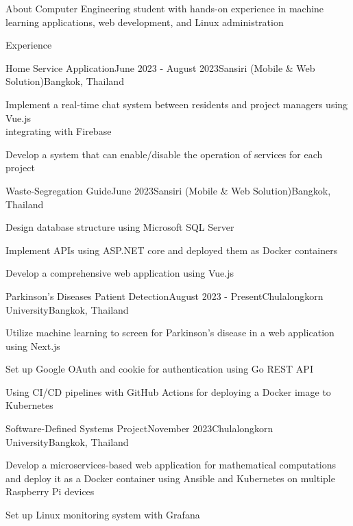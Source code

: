 \documentclass[12pt]{resume}
\begin{document}
\begin{rSection}{About}
    Computer Engineering student with hands-on experience in machine learning applications, web development, and Linux administration
\end{rSection}

\begin{rSection}{Experience}

    \begin{rSubsection}{Home Service Application}{June 2023 - August 2023}{Sansiri (Mobile \& Web Solution)}{Bangkok, Thailand}
        \item Implement a real-time chat system between residents and project managers using Vue.js \\ integrating with Firebase
        \item Develop a system that can enable/disable the operation of services for each project
    \end{rSubsection}

	\begin{rSubsection}{Waste-Segregation Guide}{June 2023}{Sansiri (Mobile \& Web Solution)}{Bangkok, Thailand}
        \item Design database structure using Microsoft SQL Server
        \item Implement APIs using ASP.NET core and deployed them as Docker containers
        \item Develop a comprehensive web application using Vue.js
	\end{rSubsection}

	\begin{rSubsection}{Parkinson's Diseases Patient Detection}{August 2023 - Present}{Chulalongkorn University}{Bangkok, Thailand}
        \item Utilize machine learning to screen for Parkinson's disease in a web application using Next.js
        \item Set up Google OAuth and cookie for authentication using Go REST API
        \item Using CI/CD pipelines with GitHub Actions for deploying a Docker image to Kubernetes
	\end{rSubsection}

	\begin{rSubsection}{Software-Defined Systems Project}{November 2023}{Chulalongkorn University}{Bangkok, Thailand}
        \item Develop a microservices-based web application for mathematical computations and deploy it as a Docker container using Ansible and Kubernetes on multiple Raspberry Pi devices
        \item Set up Linux monitoring system with Grafana
	\end{rSubsection}

\end{rSection}
\end{document}
